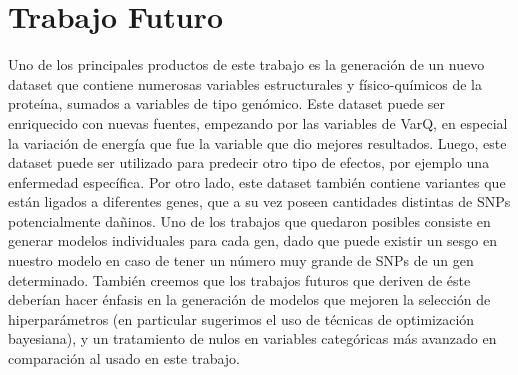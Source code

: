 \section{Trabajo Futuro}

Uno de los principales productos de este trabajo es la generación de un nuevo dataset que contiene numerosas variables estructurales y físico-químicos de la proteína, sumados a variables de tipo genómico. Este dataset puede ser enriquecido con nuevas fuentes, empezando por las variables de VarQ, en especial la variación de energía que fue la variable que dio mejores resultados. Luego, este dataset puede ser utilizado para predecir otro tipo de efectos, por ejemplo una enfermedad específica. Por otro lado, este dataset también contiene variantes que están ligados a diferentes genes, que a su vez poseen cantidades distintas de SNPs potencialmente dañinos. Uno de los trabajos que quedaron posibles consiste en generar modelos individuales para cada gen, dado que puede existir un sesgo en nuestro modelo en caso de tener un número muy grande de SNPs de un gen determinado. También creemos que los trabajos futuros que deriven de éste deberían hacer énfasis en la generación de modelos que mejoren la selección de hiperparámetros (en particular sugerimos el uso de técnicas de optimización bayesiana), y un tratamiento de nulos en variables categóricas más avanzado en comparación al usado en este trabajo. 

